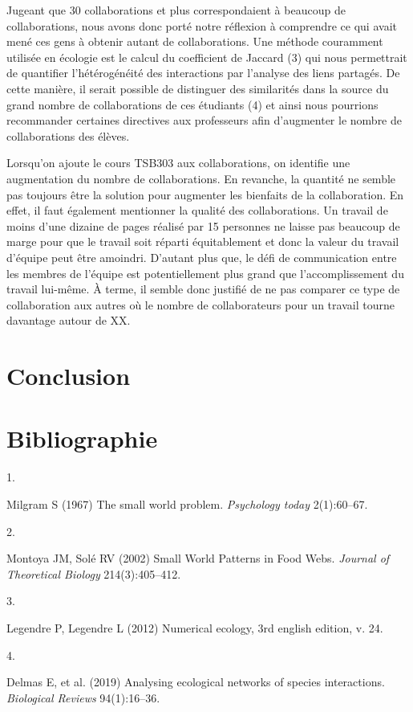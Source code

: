 \documentclass[9pt,twocolumn,twoside,]{pnas-new}
\newlength{\cslhangindent}
\newlength{\csllabelwidth}
\newlength{\cslentryspacingunit} %
\newenvironment{CSLReferences}[2] %
 {%
  \setlength{\parindent}{0pt}
  \ifodd #1
  \let\oldpar\par
  \def\par{\hangindent=\cslhangindent\oldpar}
  \fi
  \setlength{\parskip}{#2\cslentryspacingunit}
 }%
 {}
\newcommand{\CSLLeftMargin}[1]{\parbox[t]{\csllabelwidth}{#1}}
\newcommand{\CSLRightInline}[1]{\parbox[t]{\linewidth - \csllabelwidth}{#1}\break}
\begin{document}
Jugeant que 30 collaborations et plus correspondaient à beaucoup de
collaborations, nous avons donc porté notre réflexion à comprendre ce
qui avait mené ces gens à obtenir autant de collaborations. Une méthode
couramment utilisée en écologie est le calcul du coefficient de Jaccard
(3) qui nous permettrait de quantifier l'hétérogénéité des interactions
par l'analyse des liens partagés. De cette manière, il serait possible
de distinguer des similarités dans la source du grand nombre de
collaborations de ces étudiants (4) et ainsi nous pourrions recommander
certaines directives aux professeurs afin d'augmenter le nombre de
collaborations des élèves.

Lorsqu'on ajoute le cours TSB303 aux collaborations, on identifie une
augmentation du nombre de collaborations. En revanche, la quantité ne
semble pas toujours être la solution pour augmenter les bienfaits de la
collaboration. En effet, il faut également mentionner la qualité des
collaborations. Un travail de moins d'une dizaine de pages réalisé par
15 personnes ne laisse pas beaucoup de marge pour que le travail soit
réparti équitablement et donc la valeur du travail d'équipe peut être
amoindri. D'autant plus que, le défi de communication entre les membres
de l'équipe est potentiellement plus grand que l'accomplissement du
travail lui-même. À terme, il semble donc justifié de ne pas comparer ce
type de collaboration aux autres où le nombre de collaborateurs pour un
travail tourne davantage autour de XX.

\hypertarget{conclusion}{%
\section{Conclusion}\label{conclusion}}

\newpage

\hypertarget{bibliographie}{%
\section*{Bibliographie}\label{bibliographie}}

\hypertarget{refs}{}
\begin{CSLReferences}{0}{0}
\leavevmode{}%
\CSLLeftMargin{1. }
\CSLRightInline{Milgram S (1967) The small world problem.
\emph{Psychology today} 2(1):60--67.}

\leavevmode{}%
\CSLLeftMargin{2. }
\CSLRightInline{Montoya JM, Solé RV (2002) Small {World} {Patterns} in
{Food} {Webs}. \emph{Journal of Theoretical Biology} 214(3):405--412.}

\leavevmode{}%
\CSLLeftMargin{3. }
\CSLRightInline{Legendre P, Legendre L (2012) Numerical ecology, 3rd
english edition, v. 24.}

\leavevmode{}%
\CSLLeftMargin{4. }
\CSLRightInline{Delmas E, et al. (2019) Analysing ecological networks of
species interactions. \emph{Biological Reviews} 94(1):16--36.}

\end{CSLReferences}



% 
\end{document}
